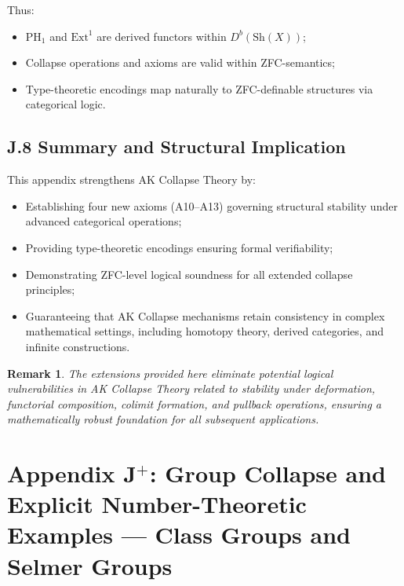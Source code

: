 \documentclass[11pt]{article}
\newtheorem{remark}[theorem]{Remark}
\begin{document}
Thus:

\begin{itemize}
    \item \( \mathrm{PH}_1 \) and \( \mathrm{Ext}^1 \) are derived functors within \( D^b(\mathrm{Sh}(X)) \);
    \item Collapse operations and axioms are valid within ZFC-semantics;
    \item Type-theoretic encodings map naturally to ZFC-definable structures via categorical logic.
\end{itemize}

\subsection*{J.8 Summary and Structural Implication}

This appendix strengthens AK Collapse Theory by:

\begin{itemize}
    \item Establishing four new axioms (A10–A13) governing structural stability under advanced categorical operations;
    \item Providing type-theoretic encodings ensuring formal verifiability;
    \item Demonstrating ZFC-level logical soundness for all extended collapse principles;
    \item Guaranteeing that AK Collapse mechanisms retain consistency in complex mathematical settings, including homotopy theory, derived categories, and infinite constructions.
\end{itemize}

\begin{remark}
The extensions provided here eliminate potential logical vulnerabilities in AK Collapse Theory related to stability under deformation, functorial composition, colimit formation, and pullback operations, ensuring a mathematically robust foundation for all subsequent applications.
\end{remark}




\section*{Appendix J$^{+}$: Group Collapse and Explicit Number-Theoretic Examples — Class Groups and Selmer Groups}
\end{document}
